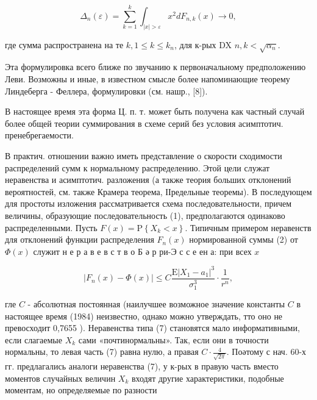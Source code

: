 \documentclass[10pt]{article}
\begin{document}
\[

\Delta_{n}(\varepsilon)=\sum_{k=1}^{k} \int_{|x|>\varepsilon} x^{2} d F_{n, k}(x) \rightarrow 0,

\]



где сумма распространена на те $k, 1 \leqslant k \leqslant k_{n}$, для к-рых DX $n, k<\sqrt{\alpha_{n}}$.



Эта формулировка всего ближе по звучанию к первоначальному предположению Леви. Возможны и иные, в известном смысле более напоминающие теорему Линдеберга - Феллера, формулировки (см. нашр., [8]).



В настоящее время эта форма Ц. п. т. может быть получена как частный случай более общей теории суммирования в схеме серий без условия асимптотич. пренебрегаемости.



В практич. отношении важно иметь представление о скорости сходимости распределений сумм к нормальному распределению. Этой цели служат неравенства и асимптотич. разложения (а также теория больших отклонений вероятностей, см. также Крамера теорема, ІІредельные теоремы). В последующем для простоты изложения рассматривается схема последовательности, причем величины, образующие последовательность (1), предполагаются одинаково распределенными. Пусть $F(x)=\mathrm{P}\left\{X_{k}<x\right\}$. Типичным примером неравенств для отклонений функции распределения $F_{n}(x)$ нормированной суммы (2) от $\Phi(x)$ служит н е р а в е в с т в о Б ә р ри-Э с с е ен а: при всех $x$



\[

\left|F_{n}(x)-\Phi(x)\right| \leqslant C \frac{\mathrm{E}\left|X_{1}-a_{1}\right|^{3}}{\sigma_{1}^{3}} \cdot \frac{1}{r^{n}},

\]



гле $C$ - абсолютная постоянная (наилучшее возможное значение константы $C$ в настоящее время (1984) неизвестно, однако можно утверждать, тто оно не превосходит 0,7655 ). Неравенства типа (7) становятся мало информативными, если слагаемые $X_{k}$ сами «почтинормальны». Так, если они в точности нормальны, то левая часть (7) равна нулю, а правая $C \cdot \frac{4}{\sqrt{2 \pi}}$. Поәтому с нач. 60-х гг. предлагались аналоги неравенства (7), у к-рых в правую часть вместо моментов случайных величин $X_{k}$ входят другие характеристики, подобные моментам, но определяемые по разности
\end{document}
